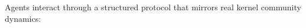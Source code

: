 % 
% 
% 
% 
% 
Agents interact through a structured protocol that mirrors real kernel community dynamics:

